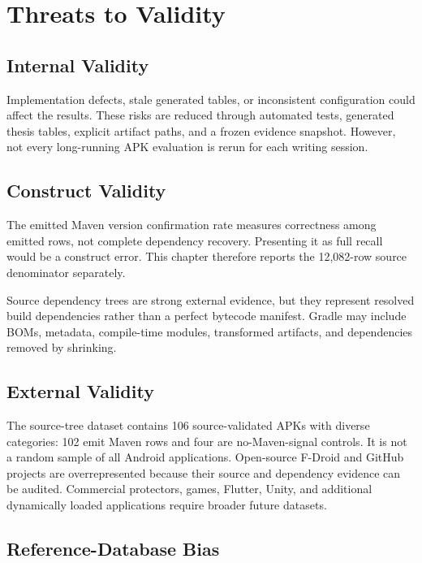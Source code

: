 \section{Threats to Validity}

\subsection{Internal Validity}

Implementation defects, stale generated tables, or inconsistent configuration
could affect the results. These risks are reduced through automated tests,
generated thesis tables, explicit artifact paths, and a frozen evidence
snapshot. However, not every long-running APK evaluation is rerun for each
writing session.

\subsection{Construct Validity}

The emitted Maven version confirmation rate measures correctness among emitted
rows, not complete dependency recovery. Presenting it as full recall would be
a construct error. This chapter therefore reports the 12,082-row source
denominator separately.

Source dependency trees are strong external evidence, but they represent
resolved build dependencies rather than a perfect bytecode manifest. Gradle
may include BOMs, metadata, compile-time modules, transformed artifacts, and
dependencies removed by shrinking.

\subsection{External Validity}

The source-tree dataset contains 106 source-validated APKs with diverse
categories: 102 emit Maven rows and four are no-Maven-signal controls. It is
not a random sample of all Android applications. Open-source F-Droid and
GitHub projects are overrepresented because their source and dependency
evidence can be audited. Commercial protectors, games, Flutter, Unity, and
additional dynamically loaded applications require broader future datasets.

\subsection{Reference-Database Bias}

